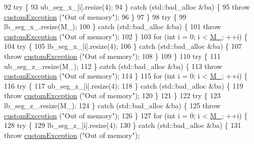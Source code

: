 \begin{DoxyCode}
92         \textcolor{keywordflow}{try} \{
93             ub\_seg\_x\_[i].resize(4);
94         \} \textcolor{keywordflow}{catch} (std::bad\_alloc &ba) \{
95             \textcolor{keywordflow}{throw} \hyperlink{classcustom_exception}{customException} (\textcolor{stringliteral}{"Out of memory"});
96         \}
97     \}
98     \textcolor{keywordflow}{try} \{
99         lb\_seg\_x\_.resize(M\_);
100     \} \textcolor{keywordflow}{catch} (std::bad\_alloc &ba) \{
101         \textcolor{keywordflow}{throw} \hyperlink{classcustom_exception}{customException} (\textcolor{stringliteral}{"Out of memory"});
102     \}
103     \textcolor{keywordflow}{for} (\textcolor{keywordtype}{int} i = 0; i < \hyperlink{classbarrier_a274cf283ffc97c22ffa9a4258369c400}{M\_}; ++i) \{
104         \textcolor{keywordflow}{try} \{
105             lb\_seg\_x\_[i].resize(4);
106         \} \textcolor{keywordflow}{catch} (std::bad\_alloc &ba) \{
107             \textcolor{keywordflow}{throw} \hyperlink{classcustom_exception}{customException} (\textcolor{stringliteral}{"Out of memory"});
108         \}
109     \}
110     \textcolor{keywordflow}{try} \{
111         ub\_seg\_z\_.resize(M\_);
112     \} \textcolor{keywordflow}{catch} (std::bad\_alloc &ba) \{
113         \textcolor{keywordflow}{throw} \hyperlink{classcustom_exception}{customException} (\textcolor{stringliteral}{"Out of memory"});
114     \}
115     \textcolor{keywordflow}{for} (\textcolor{keywordtype}{int} i = 0; i < \hyperlink{classbarrier_a274cf283ffc97c22ffa9a4258369c400}{M\_}; ++i) \{
116         \textcolor{keywordflow}{try} \{
117             ub\_seg\_z\_[i].resize(4);
118         \} \textcolor{keywordflow}{catch} (std::bad\_alloc &ba) \{
119             \textcolor{keywordflow}{throw} \hyperlink{classcustom_exception}{customException} (\textcolor{stringliteral}{"Out of memory"});
120         \}
121     \}
122     \textcolor{keywordflow}{try} \{
123         lb\_seg\_z\_.resize(M\_);
124     \} \textcolor{keywordflow}{catch} (std::bad\_alloc &ba) \{
125         \textcolor{keywordflow}{throw} \hyperlink{classcustom_exception}{customException} (\textcolor{stringliteral}{"Out of memory"});
126     \}
127     \textcolor{keywordflow}{for} (\textcolor{keywordtype}{int} i = 0; i < \hyperlink{classbarrier_a274cf283ffc97c22ffa9a4258369c400}{M\_}; ++i) \{
128         \textcolor{keywordflow}{try} \{
129             lb\_seg\_z\_[i].resize(4);
130         \} \textcolor{keywordflow}{catch} (std::bad\_alloc &ba) \{
131             \textcolor{keywordflow}{throw} \hyperlink{classcustom_exception}{customException} (\textcolor{stringliteral}{"Out of memory"});

\end{DoxyCode}
